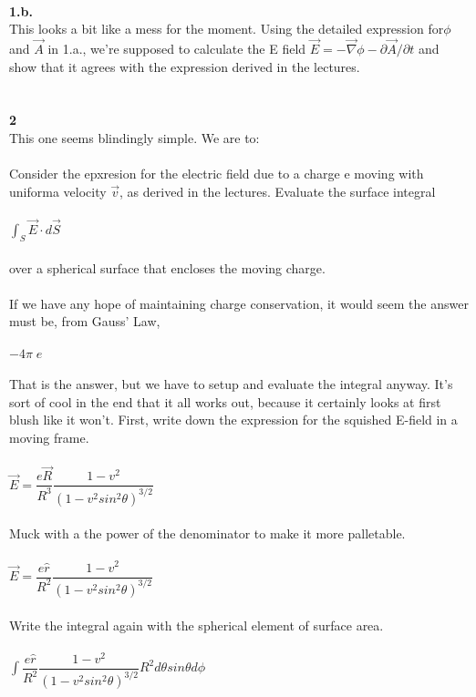 \documentclass[prb,preprint]
{revtex4-1}
\newcommand{\PRLsep}{\noindent\makebox[\linewidth]{\resizebox{0.8888\linewidth}{2pt}{$\bullet$}}\bigskip}
\begin{document}
\PRLsep
\\
\newpage
\textbf{1.b.}
\\
This looks a bit like a mess for the moment.  Using the detailed expression for$\phi$ and $\vec{A}$ in 1.a., we're supposed to calculate the E field $\vec{E} = -\vec{\nabla}\phi - \partial\vec{A}/\partial t$ and show that it agrees with the expression derived in the lectures.
\\
\\
\PRLsep
\\
\newpage
\textbf{2}
\\
This one seems blindingly simple.  We are to:
\\
\\
Consider the epxresion for the electric field due to a charge e moving with uniforma velocity $\vec{v}$, as derived in the lectures.  Evaluate the surface integral 
\\
\\
$\int_S \vec{E}\cdot d\vec{S}$
\\
\\
over a spherical surface that encloses the moving charge.
\\
\\
If we have any hope of maintaining charge conservation, it would seem the answer must be, from Gauss' Law,
\\
\\
$-4 \pi\;e$
\\
\\
That is the answer, but we have to setup and evaluate the integral anyway.  It's sort of cool in the end that it all works out, because it certainly looks at first blush like it won't.  First, write down the expression for the squished E-field in a moving frame.
\\
\\
$\vec{E} = \dfrac{e\vec{R}}{R^3}\dfrac{1-v^2}{\left(1-v^2sin^2\theta\right)^{3/2}}$
\\
\\
Muck with a the power of the denominator to make it more palletable.
\\
\\
$\vec{E} = \dfrac{e\hat{r}}{R^2}\dfrac{1-v^2}{\left(1-v^2sin^2\theta\right)^{3/2}}$
\\
\\
Write the integral again with the spherical element of surface area.
\\
\\
$\int \dfrac{e\hat{r}}{R^2}\dfrac{1-v^2}{\left(1-v^2sin^2\theta\right)^{3/2}} R^2 d\theta sin \theta d\phi$
\end{document}
